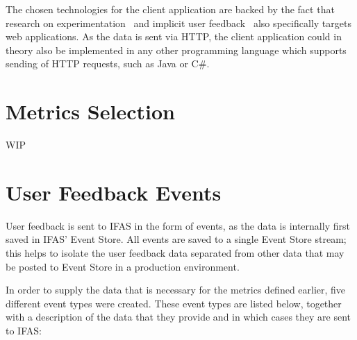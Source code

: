 The chosen technologies for the client application are backed by the fact that research on experimentation~\cite{Dmitriev2017,Kohavi2013a} and implicit user feedback~\cite{Joachims2005,Huang2011} also specifically targets web applications.
As the data is sent via \ac{HTTP}, the client application could in theory also be implemented in any other programming language which supports sending of \ac{HTTP} requests, such as Java or C\#.

\section{Metrics Selection}
\label{sec:design:metrics}

WIP
\cite{Kelly:2003:IFI:959258.959260}
\cite{Claypool2001} %
\cite{Claypool2001} %




\section{User Feedback Events}
\label{sec:design:event-structure}

User feedback is sent to \ac{IFAS} in the form of events, as the data is internally first saved in \ac{IFAS}' Event Store.
All events are saved to a single Event Store stream; this helps to isolate the user feedback data separated from other data that may be posted to Event Store in a production environment.

In order to supply the data that is necessary for the metrics defined earlier, five different event types were created.
These event types are listed below, together with a description of the data that they provide and in which cases they are sent to \ac{IFAS}:

